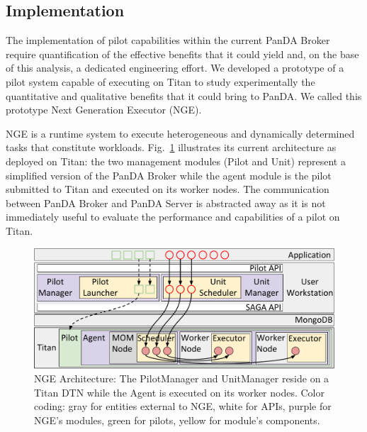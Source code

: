 \subsection{Implementation}
\label{sec:arch}

The implementation of pilot capabilities within the current PanDA Broker require
quantification of the effective benefits that it could yield and, on the base of
this analysis, a dedicated engineering effort. We developed a prototype of a
pilot system capable of executing on Titan to study experimentally the
quantitative and qualitative benefits that it could bring to PanDA. We called
this prototype Next Generation Executor (NGE).

NGE is a runtime system to execute heterogeneous and dynamically determined
tasks that constitute workloads. Fig.~\ref{fig:arch-overview} illustrates its
current architecture as deployed on Titan: the two management modules (Pilot
and Unit) represent a simplified version of the PanDA Broker while the agent
module is the pilot submitted to Titan and executed on its worker nodes. The
communication between PanDA Broker and PanDA Server is abstracted away as it
is not immediately useful to evaluate the performance and capabilities of a
pilot on Titan.

\begin{figure}
  \centering
   \includegraphics[width=\columnwidth]{figures/rp_architecture_compact_atlaswms_paper.pdf}
  \caption{NGE Architecture: The PilotManager and  UnitManager reside on a Titan
  DTN while the Agent is executed on its worker nodes. Color coding: gray for
  entities external to NGE, white for APIs, purple for NGE's modules, green for
  pilots, yellow for module's components.}
\label{fig:arch-overview}
\end{figure}

